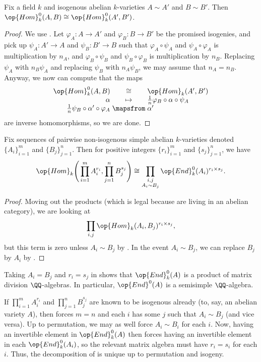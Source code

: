 \documentclass[../notes.tex]{subfiles}
\begin{document}
\begin{corollary} \label{cor:hom-isog-inv}
	Fix a field $k$ and isogenous abelian $k$-varieties $A\sim A'$ and $B\sim B'$. Then $\op{Hom}_k^0(A,B)\cong\op{Hom}_k^0(A',B')$.
\end{corollary}
\begin{proof}
	We use . Let $\varphi_A\colon A\to A'$ and $\varphi_B\colon B\to B'$ be the promised isogenies, and pick up $\psi_A\colon A'\to A$ and $\psi_B\colon B'\to B$ such that $\varphi_A\circ\psi_A$ and $\psi_A\circ\varphi_A$ is multiplication by $n_A$, and $\varphi_B\circ\psi_B$ and $\psi_B\circ\varphi_B$ is multiplication by $n_B$. Replacing $\psi_A$ with $n_B\psi_A$ and replacing $\psi_B$ with $n_A\psi_B$, we may assume that $n_A=n_B$. Anyway, we now can compute that the maps
	\[\arraycolsep=1.4pt\begin{array}{rcl}
		\op{Hom}_k^0(A,B) &\cong& \op{Hom}_k(A',B') \\
		\alpha &\mapsto& \frac1n\varphi_B\circ\alpha\circ\psi_A \\
		\frac1n\psi_B\circ\alpha'\circ\varphi_A &\mapsfrom& \alpha'
	\end{array}\]
	are inverse homomorphisms, so we are done.
\end{proof}
\begin{corollary} \label{cor:general-hom-of-ab-var}
	Fix sequences of pairwise non-isogenous simple abelian $k$-varieties denoted $\{A_i\}_{i=1}^m$ and $\{B_j\}_{j=1}^n$. Then for positive integers $\{r_i\}_{i=1}^m$ and $\{s_j\}_{j=1}^n$, we have
	\[\op{Hom}_k\Bigg(\prod_{i=1}^mA_i^{r_i},\prod_{j=1}^nB_j^{s_j}\Bigg)\cong\prod_{\substack{i,j\\A_i\sim B_j}}\op{End}^0_k(A_i)^{r_i\times s_j}.\]
\end{corollary}
\begin{proof}
	Moving out the products (which is legal because are living in an abelian category), we are looking at
	\[\prod_{i,j}\op{Hom}_k(A_i,B_j)^{r_i\times s_j},\]
	but this term is zero unless $A_i\sim B_j$ by . In the event $A_i\sim B_j$, we can replace $B_j$ by $A_i$ by .
\end{proof}
\begin{remark}
	Taking $A_i=B_j$ and $r_i=s_j$ in  shows that $\op{End}^0_k(A)$ is a product of matrix division $\QQ$-algebras. In particular, $\op{End}^0(A)$ is a semisimple $\QQ$-algebra.
\end{remark}
\begin{remark}
	If $\prod_{i=1}^mA_i^{r_i}$ and $\prod_{j=1}^nB_j^{s_j}$ are known to be isogenous already (to, say, an abelian variety $A$), then  forces $m=n$ and each $i$ has some $j$ such that $A_i\sim B_j$ (and vice versa). Up to permutation, we may as well force $A_i\sim B_i$ for each $i$. Now, having an invertible element in $\op{End}^0_k(A)$ then forces having an invertible element in each $\op{End}^0_k(A_i)$, so the relevant matrix algebra must have $r_i=s_i$ for each $i$. Thus, the decomposition of  is unique up to permutation and isogeny.
\end{remark}
\end{document}
